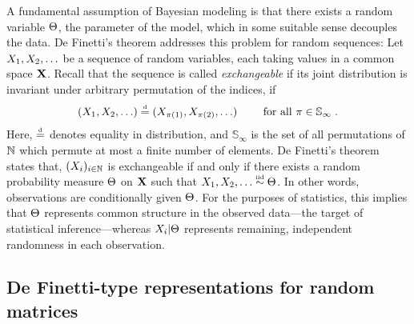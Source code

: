 \def\rweightedG{H}
\def\rgraph{G}
\def\SGinf{\mathbb{S}_{\infty}}

A fundamental assumption %
of Bayesian modeling is that there exists a random variable $\Theta$, the parameter of the model, which in some suitable sense decouples the data.
De Finetti's theorem \citep{Kallenberg:2005} 
addresses this problem for random sequences: Let $X_1,X_2,\ldots$ be a sequence of random variables, each taking values
in a common space $\mathbf{X}$. Recall that the sequence is called \emph{exchangeable} if its joint distribution 
is invariant under arbitrary permutation of the indices, \ie if
\begin{equation}
  \label{eq:exchangeability}
  (\darray_1,\darray_2,\ldots) \eqdist (\darray_{\pi(1)},\darray_{\pi(2)},\ldots) \qquad\text{ for all } \pi\in\SGinf\;.
\end{equation}
Here, $\stackrel{\mbox{\tiny d}}{=}$ denotes equality in distribution, and $\SGinf$ is the set of all permutations of $\mathbb{N}$ which permute at most a finite number of elements.
De Finetti's theorem states that, $(X_i)_{i\in\mathbb{N}}$ is exchangeable if and only if there exists a random probability measure $\Theta$ on $\mathbf{X}$
such that $X_1,X_2,\ldots\overset{\mbox{\tiny iid}}{\sim}\Theta$. In other words, observations are conditionally \iid given $\Theta$. For the purposes of statistics,
this implies that $\Theta$ represents common structure in the observed data---the target of statistical inference---whereas $X_i|\Theta$ represents
remaining, independent randomness in each observation. 



\subsection{De Finetti-type representations for random matrices}

